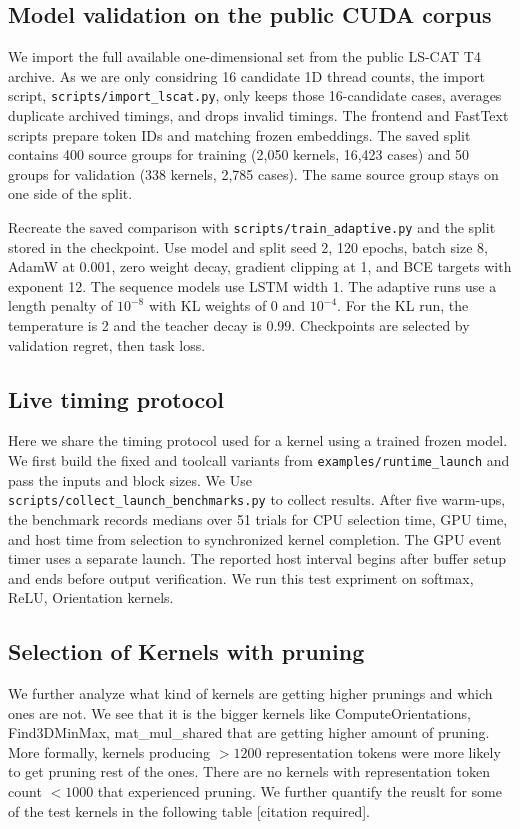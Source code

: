 \documentclass[11pt,letterpaper]{article}
\begin{document}
\subsection{Model validation on the public CUDA corpus}

We import the full available one-dimensional set from the public LS-CAT T4 archive.
As we are only considring 16 candidate 1D thread counts, the import script, \texttt{scripts/import\_lscat.py}, only keeps those 16-candidate cases, averages duplicate
archived timings, and drops invalid timings. The frontend and FastText scripts prepare token IDs and
matching frozen embeddings. The saved split contains 400 source groups for training (2,050 kernels, 16,423
cases) and 50 groups for validation (338 kernels, 2,785 cases). The same source group stays on one side of
the split.

Recreate the saved comparison with \texttt{scripts/train\_adaptive.py} and the split stored in the
checkpoint. Use model and split seed 2, 120 epochs, batch size 8, AdamW at 0.001, zero weight decay,
gradient clipping at 1, and BCE targets with exponent 12. The sequence models use LSTM width 1. The adaptive
runs use a length penalty of \(10^{-8}\) with KL weights of 0 and \(10^{-4}\). For the KL run, the
temperature is 2 and the teacher decay is 0.99. Checkpoints are selected by validation regret, then task
loss.

\subsection{Live timing protocol}
Here we share the timing protocol used for a kernel using a trained frozen model. We first build the fixed and toolcall variants from \texttt{examples/runtime\_launch} and pass the inputs and block
sizes. We Use \texttt{scripts/collect\_launch\_benchmarks.py} to collect
results. After five warm-ups, the benchmark records medians over 51 trials for CPU selection time, GPU time,
and host time from selection to synchronized kernel completion. The GPU event timer uses a separate launch.
The reported host interval begins after buffer setup and ends before output verification. We run this test expriment on softmax, ReLU, Orientation kernels.


\subsection{Selection of Kernels with pruning}
We further analyze what kind of kernels are getting higher prunings and which ones are not. We see that it is the bigger kernels like ComputeOrientations, Find3DMinMax, mat_mul_shared that are getting higher 
amount of pruning. More formally, kernels producing $>1200$ representation tokens were more likely to get pruning rest of the ones. There are no kernels
with representation token count $<1000$ that experienced pruning. We further quantify the reuslt for some of the test kernels in the following table [citation required].
\end{document}
